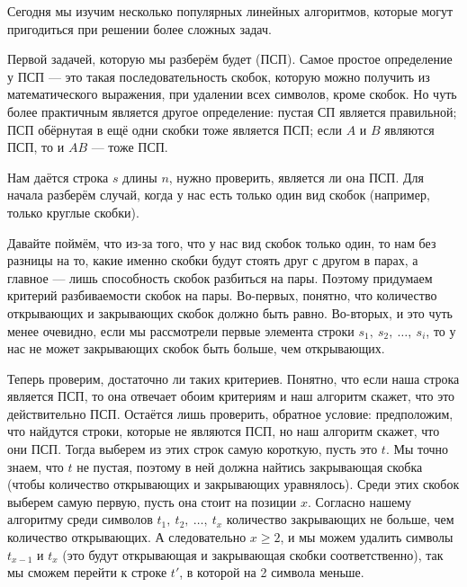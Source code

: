Сегодня мы изучим несколько популярных линейных алгоритмов, которые могут пригодиться при решении более сложных задач.


Первой задачей, которую мы разберём будет  (ПСП). Самое простое определение у ПСП — это такая последовательность скобок, которую можно получить из математического выражения, при удалении всех символов, кроме скобок. Но чуть более практичным является другое определение: пустая СП является правильной; ПСП обёрнутая в ещё одни скобки тоже является ПСП; если $A$ и $B$ являются ПСП, то и $AB$ — тоже ПСП.

Нам даётся строка $s$ длины $n$, нужно проверить, является ли она ПСП. Для начала разберём случай, когда у нас есть только один вид скобок (например, только круглые скобки).

Давайте поймём, что из-за того, что у нас вид скобок только один, то нам без разницы на то, какие именно скобки будут стоять друг с другом в парах, а главное — лишь способность скобок разбиться на пары. Поэтому придумаем критерий разбиваемости скобок на пары. Во-первых, понятно, что количество открывающих и закрывающих скобок должно быть равно. Во-вторых, и это чуть менее очевидно, если мы рассмотрели первые элемента строки $s_1,\ s_2,\ \ldots,\ s_i$, то у нас не может закрывающих скобок быть больше, чем открывающих. 

Теперь проверим, достаточно ли таких критериев. Понятно, что если наша строка является ПСП, то она отвечает обоим критериям и наш алгоритм скажет, что это действительно ПСП. Остаётся лишь проверить, обратное условие: предположим, что найдутся строки, которые не являются ПСП, но наш алгоритм скажет, что они ПСП. Тогда выберем из этих строк самую короткую, пусть это $t$. Мы точно знаем, что $t$ не пустая, поэтому в ней должна найтись закрывающая скобка (чтобы количество открывающих и закрывающих уравнялось). Среди этих скобок выберем самую первую, пусть она стоит на позиции $x$. Согласно нашему алгоритму среди символов $t_1,\ t_2,\ \ldots,\ t_x$ количество закрывающих не больше, чем количество открывающих. А следовательно $x \geq 2$, и мы можем удалить символы $t_{x - 1}$ и $t_x$ (это будут открывающая и закрывающая скобки соответственно), так мы сможем перейти к строке $t'$, в которой на 2 символа меньше.

